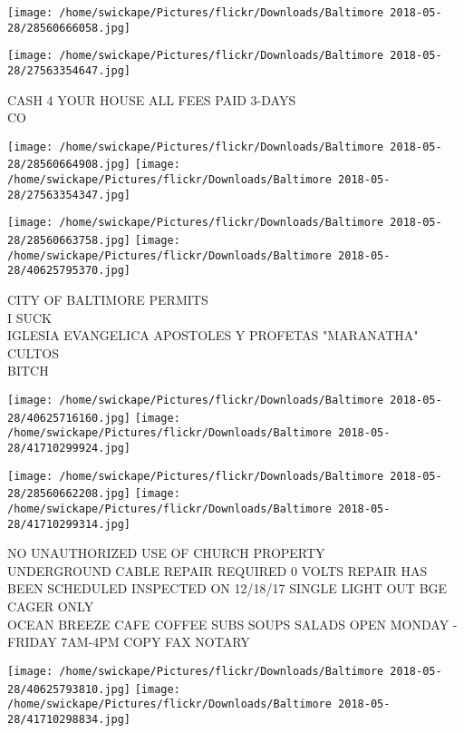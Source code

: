 \documentclass[10pt,letterpaper]{article}
\begin{document}
\texttt{[image: /home/swickape/Pictures/flickr/Downloads/Baltimore 2018-05-28/28560666058.jpg]}

\vspace{0.25in}
\texttt{[image: /home/swickape/Pictures/flickr/Downloads/Baltimore 2018-05-28/27563354647.jpg]}

CASH 4 YOUR HOUSE ALL FEES PAID 3{-}DAYS\\
CO\\
\pagebreak

\texttt{[image: /home/swickape/Pictures/flickr/Downloads/Baltimore 2018-05-28/28560664908.jpg]}
\texttt{[image: /home/swickape/Pictures/flickr/Downloads/Baltimore 2018-05-28/27563354347.jpg]}

\texttt{[image: /home/swickape/Pictures/flickr/Downloads/Baltimore 2018-05-28/28560663758.jpg]}
\texttt{[image: /home/swickape/Pictures/flickr/Downloads/Baltimore 2018-05-28/40625795370.jpg]}

CITY OF BALTIMORE PERMITS\\
I SUCK\\
IGLESIA EVANGELICA APOSTOLES Y PROFETAS "MARANATHA" CULTOS\\
BITCH\\
\pagebreak

\texttt{[image: /home/swickape/Pictures/flickr/Downloads/Baltimore 2018-05-28/40625716160.jpg]}
\texttt{[image: /home/swickape/Pictures/flickr/Downloads/Baltimore 2018-05-28/41710299924.jpg]}

\texttt{[image: /home/swickape/Pictures/flickr/Downloads/Baltimore 2018-05-28/28560662208.jpg]}
\texttt{[image: /home/swickape/Pictures/flickr/Downloads/Baltimore 2018-05-28/41710299314.jpg]}

NO UNAUTHORIZED USE OF CHURCH PROPERTY\\
UNDERGROUND CABLE REPAIR REQUIRED 0 VOLTS REPAIR HAS BEEN SCHEDULED INSPECTED ON 12/18/17 SINGLE LIGHT OUT BGE\\
CAGER ONLY\\
OCEAN BREEZE CAFE COFFEE SUBS SOUPS SALADS OPEN MONDAY {-} FRIDAY 7AM{-}4PM COPY FAX NOTARY\\
\pagebreak

\texttt{[image: /home/swickape/Pictures/flickr/Downloads/Baltimore 2018-05-28/40625793810.jpg]}
\texttt{[image: /home/swickape/Pictures/flickr/Downloads/Baltimore 2018-05-28/41710298834.jpg]}
\end{document}
